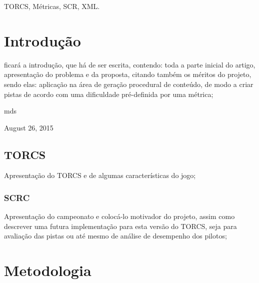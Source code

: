 \documentclass[journal]{IEEEtran}
\begin{document}
\begin{IEEEkeywords}
TORCS, Métricas, SCR, XML.
\end{IEEEkeywords}


%
\IEEEpeerreviewmaketitle



\section{Introdução}

 ficará a introdução, que há de ser escrita, contendo: toda a parte inicial do artigo, apresentação do problema e da proposta, citando também os méritos do projeto, sendo elas:  aplicação na área de geração procedural de conteúdo, de modo a criar pistas de acordo com uma dificuldade pré-definida por uma métrica;


\hfill mds
 
\hfill August 26, 2015

\subsection{TORCS}
Apresentação do TORCS\cite{TORCS} e de algumas características do jogo;


\subsubsection{SCRC}
Apresentação do campeonato e colocá-lo motivador do projeto, assim como descrever uma futura implementação para esta versão do TORCS, seja para avaliação das pistas ou até mesmo de análise de desempenho dos pilotos;



\section{Metodologia}
\end{document}

